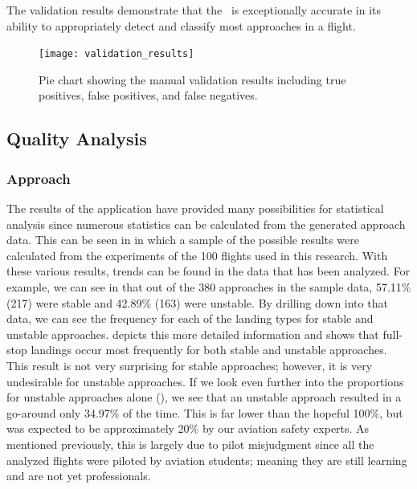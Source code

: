         The validation results demonstrate that the \toolname\ is exceptionally accurate in its ability to appropriately detect and classify most approaches in a flight.

        \begin{figure}
            \centering
            \texttt{[image: validation\_results]}
            \caption{Pie chart showing the manual validation results including true positives, false positives, and false negatives.}
            \label{fig:validation_results}
        \end{figure}
    
    
\subsection{Quality Analysis}


    \subsubsection{Approach}
    
    	The results of the application have provided many possibilities for statistical analysis since numerous statistics can be calculated from the generated approach data.  This can be seen in  in which a sample of the possible results were calculated from the experiments of the 100 flights used in this research.  With these various results, trends can be found in the data that has been analyzed.  For example, we can see in  that out of the 380 approaches in the sample data, 57.11\% (217) were stable and 42.89\% (163) were unstable.  By drilling down into that data, we can see the frequency for each of the landing types for stable and unstable approaches.   depicts this more detailed information and shows that full-stop landings occur most frequently for both stable and unstable approaches.  This result is not very surprising for stable approaches; however, it is very undesirable for unstable approaches.  If we look even further into the proportions for unstable approaches alone (), we see that an unstable approach resulted in a go-around only 34.97\% of the time.  This is far lower than the hopeful 100\%, but was expected to be approximately 20\% by our aviation safety experts.  As mentioned previously, this is largely due to pilot misjudgment since all the analyzed flights were piloted by aviation students; meaning they are still learning and are not yet professionals.
    
